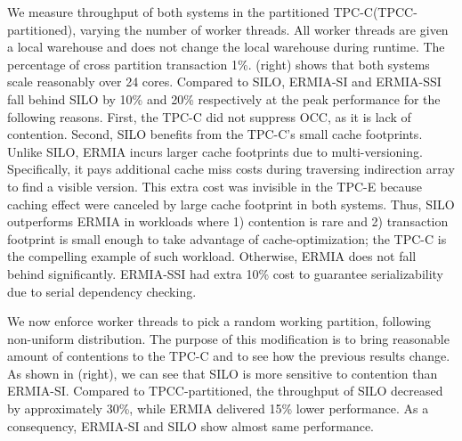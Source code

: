 We measure throughput of both systems in the partitioned TPC-C(TPCC-partitioned), varying the number of worker threads. All worker threads are given a local warehouse and does not change the local warehouse during runtime. The percentage of cross partition transaction 1\%. (right) shows that both systems scale reasonably over 24 cores. Compared to SILO, ERMIA-SI and ERMIA-SSI fall behind SILO by 10\% and 20\% respectively at the peak performance for the following reasons. First, the TPC-C did not suppress OCC, as it is lack of contention. Second, SILO benefits from the TPC-C's small cache footprints. Unlike SILO, ERMIA incurs larger cache footprints due to multi-versioning. Specifically, it pays additional cache miss costs during traversing indirection array to find a visible version. This extra cost was invisible in the TPC-E because caching effect were canceled by large cache footprint in both systems. Thus, SILO outperforms ERMIA in workloads where 1) contention is rare and 2) transaction footprint is small enough to take advantage of cache-optimization; the TPC-C is the compelling example of such workload. Otherwise, ERMIA does not fall behind significantly. ERMIA-SSI had extra 10\% cost to guarantee serializability due to serial dependency checking. %

We now enforce worker threads to pick a random working partition, following non-uniform distribution. The purpose of this modification is to bring reasonable amount of contentions to the TPC-C and to see how the previous results change. As shown in (right), we can see that SILO is more sensitive to contention than ERMIA-SI. Compared to TPCC-partitioned, the throughput of SILO decreased by approximately 30\%, while ERMIA delivered 15\% lower performance. As a consequency, ERMIA-SI and SILO show almost same performance.

